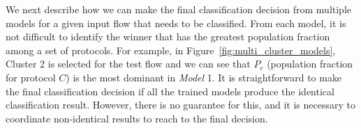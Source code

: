 \documentclass[conference]{IEEEtran}
\begin{document}



We next describe how we can make the final classification decision from multiple models for a given input flow that needs to be classified.
From each model, it is not difficult to identify the winner that has the greatest population fraction among a set of protocols.
For example, in Figure~\ref{fig:multi_cluster_models}, Cluster 2 is selected for the test flow and we can see that $P_c$ (population fraction for protocol $C$) is the most dominant in \emph{Model} 1.
It is straightforward to make the final classification decision if all the trained models produce the identical classification result.
However, there is no guarantee for this, and it is necessary to coordinate non-identical results to reach to the final decision.
\end{document}
